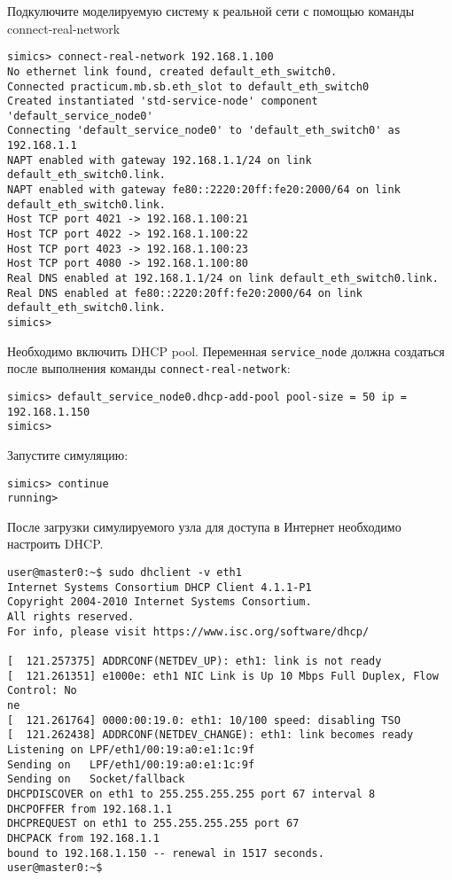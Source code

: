 \begin{enumerate*}
\item Подкулючите моделируемую систему к реальной сети с помощью команды connect-real-network
\begin{lstlisting}
simics> connect-real-network 192.168.1.100
No ethernet link found, created default_eth_switch0.
Connected practicum.mb.sb.eth_slot to default_eth_switch0
Created instantiated 'std-service-node' component 'default_service_node0'
Connecting 'default_service_node0' to 'default_eth_switch0' as 192.168.1.1
NAPT enabled with gateway 192.168.1.1/24 on link default_eth_switch0.link.
NAPT enabled with gateway fe80::2220:20ff:fe20:2000/64 on link default_eth_switch0.link.
Host TCP port 4021 -> 192.168.1.100:21
Host TCP port 4022 -> 192.168.1.100:22
Host TCP port 4023 -> 192.168.1.100:23
Host TCP port 4080 -> 192.168.1.100:80
Real DNS enabled at 192.168.1.1/24 on link default_eth_switch0.link.
Real DNS enabled at fe80::2220:20ff:fe20:2000/64 on link default_eth_switch0.link.
simics>
\end{lstlisting}

\item Необходимо включить DHCP pool. Переменная \texttt{service_node} должна создаться после выполнения команды \texttt{connect-real-network}:
\begin{lstlisting}
simics> default_service_node0.dhcp-add-pool pool-size = 50 ip = 192.168.1.150
simics>
\end{lstlisting}

\item Запустите симуляцию:
\begin{lstlisting}
simics> continue
running>
\end{lstlisting}

\item После загрузки симулируемого узла для доступа в Интернет необходимо настроить DHCP.
\begin{lstlisting}
user@master0:~$ sudo dhclient -v eth1                                           
Internet Systems Consortium DHCP Client 4.1.1-P1
Copyright 2004-2010 Internet Systems Consortium.
All rights reserved.
For info, please visit https://www.isc.org/software/dhcp/

[  121.257375] ADDRCONF(NETDEV_UP): eth1: link is not ready
[  121.261351] e1000e: eth1 NIC Link is Up 10 Mbps Full Duplex, Flow Control: No
ne
[  121.261764] 0000:00:19.0: eth1: 10/100 speed: disabling TSO
[  121.262438] ADDRCONF(NETDEV_CHANGE): eth1: link becomes ready
Listening on LPF/eth1/00:19:a0:e1:1c:9f
Sending on   LPF/eth1/00:19:a0:e1:1c:9f
Sending on   Socket/fallback
DHCPDISCOVER on eth1 to 255.255.255.255 port 67 interval 8
DHCPOFFER from 192.168.1.1
DHCPREQUEST on eth1 to 255.255.255.255 port 67
DHCPACK from 192.168.1.1
bound to 192.168.1.150 -- renewal in 1517 seconds.
user@master0:~$ 
\end{lstlisting}


\end{enumerate*}
